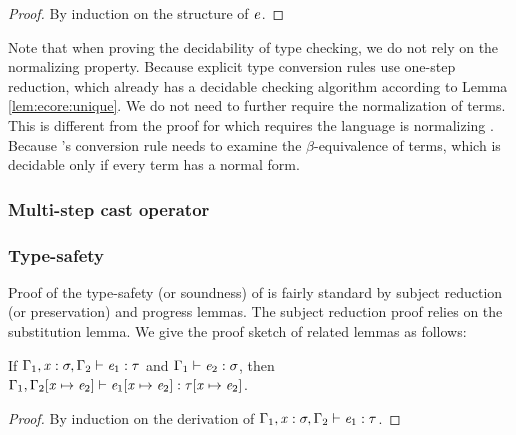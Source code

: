 \begin{proof}
	By induction on the structure of $\mathit{e}$.
\end{proof}

Note that when proving the decidability of type checking, we do not rely on the normalizing property. Because explicit type conversion rules use one-step reduction, which already has a decidable checking algorithm according to Lemma \ref{lem:ecore:unique}. We do not need to further require the normalization of terms. This is different from the proof for \cc which requires the language is normalizing . Because \cc's conversion rule needs to examine the $\beta$-equivalence of terms, which is decidable only if every term has a normal form.

\subsubsection{Multi-step cast operator}

\subsubsection{Type-safety}
Proof of the type-safety (or soundness) of \ecore is fairly standard by subject reduction (or preservation) and progress lemmas. The subject reduction proof relies on the substitution lemma. We give the proof sketch of related lemmas as follows:

\begin{lem}\label{lem:ecore:subst}
	If $\Gamma_{{\mathrm{1}}}  ,  \mathit{x}  :  \sigma  ,  \Gamma_{{\mathrm{2}}}  \vdash  \mathit{e_{{\mathrm{1}}}}  :  \tau$ and $\Gamma_{{\mathrm{1}}}  \vdash  \mathit{e_{{\mathrm{2}}}}  :  \sigma$, then $\Gamma_{{\mathrm{1}}}  ,  \Gamma_{{\mathrm{2}}}  [  \mathit{x}  \mapsto  \mathit{e_{{\mathrm{2}}}}  ]  \vdash  \mathit{e_{{\mathrm{1}}}}  [  \mathit{x}  \mapsto  \mathit{e_{{\mathrm{2}}}}  ]  :  \tau  [  \mathit{x}  \mapsto  \mathit{e_{{\mathrm{2}}}}  ]$.
\end{lem}

\begin{proof}
    By induction on the derivation of $\Gamma_{{\mathrm{1}}}  ,  \mathit{x}  :  \sigma  ,  \Gamma_{{\mathrm{2}}}  \vdash  \mathit{e_{{\mathrm{1}}}}  :  \tau$.
\end{proof}

